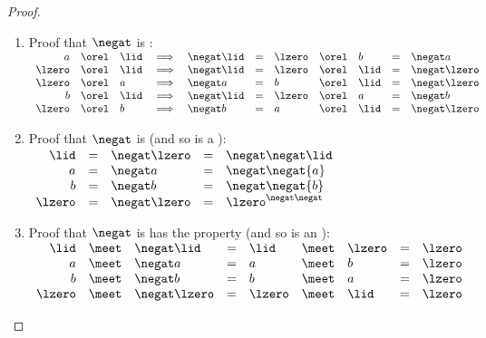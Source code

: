 \begin{proof}
\begin{enumerate}
  \item Proof that $\negat$ is :
    $\begin{array}[t]{rcl c lcl c lclc}
      a      &\orel& \lid &\implies& \negat\lid &=& \lzero &\orel& b    &=&  \negat a     \\
      \lzero &\orel& \lid &\implies& \negat\lid &=& \lzero &\orel& \lid &=& \negat\lzero \\
      \lzero &\orel& a    &\implies&  \negat a   &=& b      &\orel& \lid &=& \negat\lzero \\
      b      &\orel& \lid &\implies& \negat\lid &=& \lzero &\orel& a    &=&  \negat b     \\
      \lzero &\orel& b    &\implies&  \negat b   &=& a      &\orel& \lid &=& \negat\lzero 
    \end{array}$

  \item Proof that $\negat$ is  (and so is a ):
    $\begin{array}[t]{rcl cl}
      \lid   &=& \negat\lzero &=& \negat\negat\lid   \\
      a      &=& \negat a      &=& \negat\negat{a}      \\
      b      &=& \negat b      &=& \negat\negat{b}      \\
      \lzero &=& \negat\lzero &=& \lzero^{\negat\negat} \\
    \end{array}$

  \item Proof that $\negat$ is has the  property (and so is an ):
    \\$\begin{array}[t]{rcl clclcl}
      \lid   &\meet& \negat\lid   &=& \lid   &\meet& \lzero &=& \lzero \\
      a      &\meet& \negat a      &=& a      &\meet& b      &=& \lzero \\
      b      &\meet& \negat b      &=& b      &\meet& a      &=& \lzero \\
      \lzero &\meet& \negat\lzero &=& \lzero &\meet& \lid   &=& \lzero 
    \end{array}$


\end{enumerate}
\end{proof}
